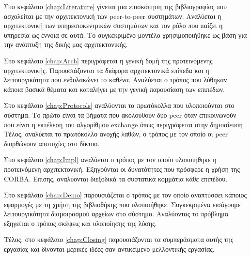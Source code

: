 Στο κεφάλαιο \ref{chap:Literature} γίνεται μια επισκόπηση της βιβλιογραφίας 
που ασχολείται με την αρχιτεκτονική των peer-to-peer συστημάτων. 
Αναλύεται η αρχιτεκτονική των υπηρεσιοκεντρικών συστημάτων και τον ρόλο 
που παίζει η υπηρεσία ως έννοια σε αυτά. Το συγκεκριμένο μοντέλο 
χρησιμοποιήθηκε ως βάση για την ανάπτυξη της δικής μας αρχιτεκτονικής.

Στο κεφάλαιο \ref{chap:Arch} περιγράφεται η γενική δομή της προτεινόμενης 
αρχιτεκτονικής. Παρουσιάζονται τα διάφορα αρχιτεκτονικά επίπεδα και η 
λειτουργικότητα που ενθυλακώνει το καθένα. Αναλύεται ο τρόπος που λύθηκαν 
κάποια βασικά θέματα και καταλήγει με την γενική παρουσίαση των 
επιπέδων.

Στο κεφάλαιο \ref{chap:Protocols} αναλύονται τα πρωτόκολλα που υλοποιούνται 
στο σύστημα. Το πρώτο είναι τα βήματα που ακολουθούν δυο peer όταν 
επικοινωνούν που είναι η εκτέλεση του αλγορίθμου exchange όπως περιγράφεται 
στην δημοσίευση \citep{Abererb}. Τέλος, αναλύεται το πρωτόκολλο ανοχής λαθών, 
ο τρόπος με τον οποίο οι peer διορθώνουν αποτυχίες στο δίκτυο.

Στο κεφάλαιο \ref{chap:Impl} αναλύεται ο τρόπος με τον οποίο υλοποιήθηκε 
η προτεινόμενη αρχιτεκτονική. Εξηγούνται οι δυνατότητες που πρόσφερε η 
χρήση της CORBA. Επίσης, αναλύονται διεξοδικά τα συστατικά κομμάτια κάθε 
επιπέδου.

Στο κεφάλαιο \ref{chap:Demo} παρουσιάζεται ο τρόπος με τον οποίο αναπτύσσει 
κάποιος εφαρμογές με τη χρήση της βιβλιοθήκης που υλοποιήθηκε. Συγκεκριμένα 
εισάγουμε λειτουργικότητα διαμοιρασμού αρχείων στο σύστημα. Αναλύοντας το 
πρόβλημα εξηγείται ο τρόπος σκέψεις και υλοποίησης της λύσης.

Τέλος, στο κεφάλαιο \ref{chap:Closing} παρουσιάζονται τα συμπεράσματα αυτής 
της εργασίας και δίνονται μερικές ιδέες σαν αντικείμενο μελλοντικής εργασίας.

